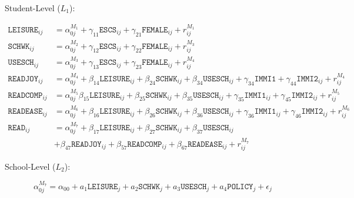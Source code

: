 \documentclass[a4paper,11pt,UKenglish,twoside,openright]{report}\usepackage[]{graphicx}\usepackage[]{color}
\begin{document}
\newpage

Student-Level ($L_1$):

\begin{equation}
    \begin{aligned}
        \texttt{LEISURE}_{ij} &= \alpha_{0j}^{M_1} + \gamma_{11}\texttt{ESCS}_{ij} + \gamma_{21}\texttt{FEMALE}_{ij} + r^{M_1}_{ij}\\
        \texttt{SCHWK}_{ij} &= \alpha_{0j}^{M_2} + \gamma_{12}\texttt{ESCS}_{ij} + \gamma_{22}\texttt{FEMALE}_{ij} + r^{M_3}_{ij}\\
        \texttt{USESCH}_{ij} &= \alpha_{0j}^{M_3} + \gamma_{13}\texttt{ESCS}_{ij} + \gamma_{23}\texttt{FEMALE}_{ij} + r^{M_4}_{ij}\\
        \texttt{READJOY}_{ij}  &= \alpha_{0j}^{M_4} + \beta_{14}\texttt{LEISURE}_{ij} + \beta_{24}\texttt{SCHWK}_{ij} + \beta_{34}\texttt{USESCH}_{ij} + \gamma_{34}\texttt{IMMI1} + \gamma_{44}\texttt{IMMI2}_{ij} + r^{M_4}_{ij}\\
        \texttt{READCOMP}_{ij} &= \alpha_{0j}^{M_5} \beta_{15}\texttt{LEISURE}_{ij} + \beta_{25}\texttt{SCHWK}_{ij} +  \beta_{35}\texttt{USESCH}_{ij} + \gamma_{35}\texttt{IMMI1}_{ij} + \gamma_{45}\texttt{IMMI2}_{ij} + r^{M_5}_{ij}\\
        \texttt{READEASE}_{ij} &= \alpha_{0j}^{M_6} + \beta_{16}\texttt{LEISURE}_{ij} + \beta_{26}\texttt{SCHWK}_{ij} +  \beta_{36}\texttt{USESCH}_{ij} + \gamma_{36}\texttt{IMMI1}_{ij} + \gamma_{46}\texttt{IMMI2}_{ij} + r^{M_6}_{ij}\\
        \texttt{READ}_{ij} &= \alpha_{0j}^{M_7} + \beta_{17}\texttt{LEISURE}_{ij} + \beta_{27}\texttt{SCHWK}_{ij} + \beta_{37}\texttt{USESCH}_{ij}\\
        &+ \beta_{47}\texttt{READJOY}_{ij} + \beta_{57}\texttt{READCOMP}_{ij} + \beta_{67}\texttt{READEASE}_{ij} + r^{M_7}_{ij}
    \end{aligned}
\end{equation}

School-Level ($L_2$):

\begin{equation}
    \alpha_{0j}^{M_7} = \alpha_{00} + a_1\texttt{LEISURE}_j + a_2\texttt{SCHWK}_j + a_3\texttt{USESCH}_j + a_4\texttt{POLICY}_j + \epsilon_j
\end{equation}

\newpage
\end{document}
